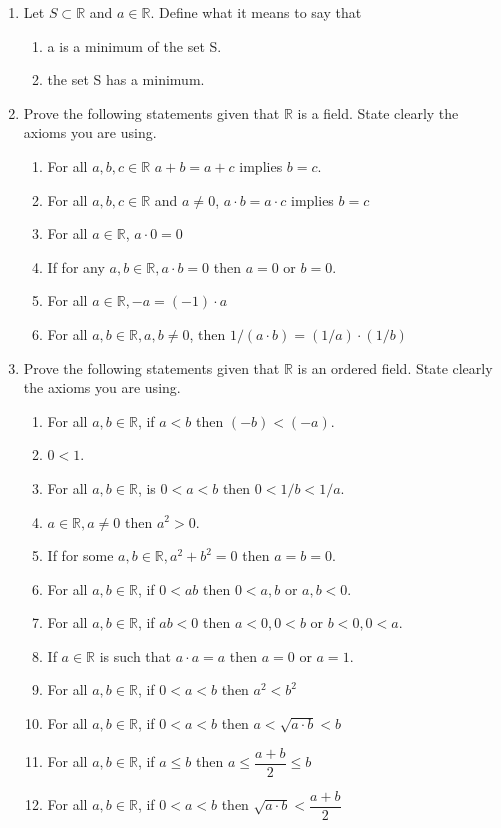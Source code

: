 \begin{enumerate}[label = (\arabic*)]
    \item Let $S\subset\mathbb{R}$ and $a\in\mathbb{R}$. Define what it means to say that
    \begin{enumerate}
        \itemsep0em
        \item a is a minimum of the set S.
        \item the set S has a minimum.
    \end{enumerate}
    \item Prove the following statements given that $\mathbb{R}$ is a field. State clearly the axioms you are using.
    \begin{enumerate}
        \itemsep0em
        \item For all $a, b, c \in \mathbb{R}$ $a+b=a+c$ implies $b=c$.
        \item For all $a, b, c \in \mathbb{R}$ and $a\neq0$, $a\cdot b = a\cdot c$ implies $b=c$
        \item For all $ a\in \mathbb{R}$, $a\cdot 0 = 0$
        \item If for any $a, b \in \mathbb{R}, a\cdot b=0$ then $a=0$ or $b=0$.
        \item For all $a \in \mathbb{R}, -a = (-1)\cdot a$
        \item For all $a, b \in \mathbb{R}, a, b \neq 0$, then $1/(a\cdot b) = \left(1/a\right)\cdot\left(1/b\right)$
    \end{enumerate}
    \item Prove the following statements given that $\mathbb{R}$ is an ordered field. State clearly the axioms you are using.
    \begin{enumerate}
        \item For all $a, b \in\mathbb{R}$, if $a<b$ then $(-b)<(-a)$.
        \item $0<1$.
        \item For all $a, b \in\mathbb{R}$, is $0<a<b$ then $0<1/b<1/a$.
        \item $a \in \mathbb{R}, a\neq0$ then $a^2>0$.
        \item If for some $a, b \in\mathbb{R}, a^2 + b^2 = 0$ then $a=b=0$.
        \item For all $a, b \in\mathbb{R}$, if $0 < ab$ then $0 < a, b$ or $a, b < 0$.
        \item For all $a, b \in\mathbb{R}$, if $ab < 0$ then $a < 0, 0 < b$ or $b < 0, 0 < a$.
        \item If $a \in \mathbb{R}$ is such that $a\cdot a = a$ then $a = 0$ or $a=1$.
        \item For all $a, b \in \mathbb{R}$, if $0 < a < b$ then $a^2 < b^2$
        \item For all $a, b \in \mathbb{R}$, if $0 < a < b$ then $a < \sqrt{a\cdot b} < b$
        \item For all $a, b \in \mathbb{R}$, if $a \le b$ then $a\le\dfrac{a+b}{2} \le b$
        \item  For all $a, b \in \mathbb{R}$, if $ 0 < a < b$ then $\sqrt{a\cdot b} < \dfrac{a+b}{2}$
    \end{enumerate}
\end{enumerate}
